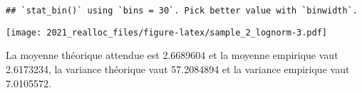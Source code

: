 \documentclass[
]{book}
\begin{document}
\begin{verbatim}
## `stat_bin()` using `bins = 30`. Pick better value with `binwidth`.
\end{verbatim}

\texttt{[image: 2021\_realloc\_files/figure-latex/sample\_2\_lognorm-3.pdf]}

La moyenne théorique attendue est 2.6689604 et la moyenne empirique vaut 2.6173234, la variance théorique vaut 57.2084894 et la variance empirique vaut 7.0105572.

  
\end{document}
